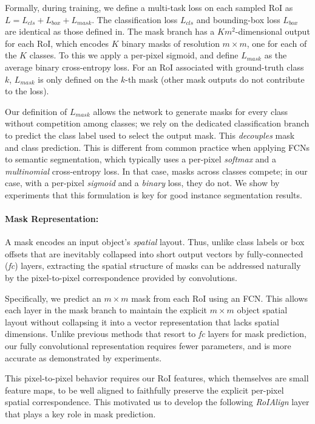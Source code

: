 Formally, during training, we define a multi-task loss on each sampled RoI as $L = L_{cls} + L_{box} + L_{mask}$. The classification loss $L_{cls}$ and bounding-box loss $L_{box}$ are identical as those defined in. The mask branch has a $Km^2$-dimensional output for each RoI, which encodes $K$ binary masks of resolution $m \times m$, one for each of the $K$ classes. To this we apply a per-pixel sigmoid, and define $L_{mask}$ as the average binary cross-entropy loss. For an RoI associated with ground-truth class $k$, $L_{mask}$ is only defined on the $k$-th mask (other mask outputs do not contribute to the loss).

Our definition of $L_{mask}$ allows the network to generate masks for every class without competition among classes; we rely on the dedicated classification branch to predict the class label used to select the output mask. This \emph{decouples} mask and class prediction. This is different from common practice when applying FCNs to semantic segmentation, which typically uses a per-pixel \emph{softmax} and a \emph{multinomial} cross-entropy loss. In that case, masks across classes compete; in our case, with a per-pixel \emph{sigmoid} and a \emph{binary} loss, they do not. We show by experiments that this formulation is key for good instance segmentation results.

\paragraph{Mask Representation:} A mask encodes an input object's \emph{spatial} layout. Thus, unlike class labels or box offsets that are inevitably collapsed into short output vectors by fully-connected (\emph{fc}) layers, extracting the spatial structure of masks can be addressed naturally by the pixel-to-pixel correspondence provided by convolutions.

Specifically, we predict an $m \times m$ mask from each RoI using an FCN. This allows each layer in the mask branch to maintain the explicit $m \times m$ object spatial layout without collapsing it into a vector representation that lacks spatial dimensions. Unlike previous methods that resort to \emph{fc} layers for mask prediction, our fully convolutional representation requires fewer parameters, and is more accurate as demonstrated by experiments.

This pixel-to-pixel behavior requires our RoI features, which themselves are small feature maps, to be well aligned to faithfully preserve the explicit per-pixel spatial correspondence. This motivated us to develop the following \emph{RoIAlign} layer that plays a key role in mask prediction.

